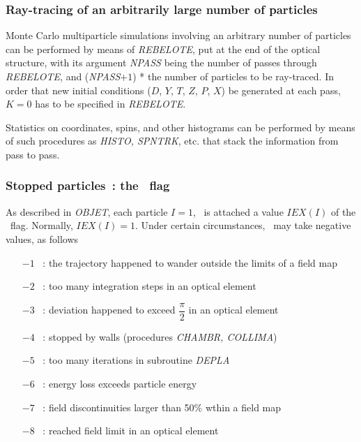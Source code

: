\subsubsection{Ray-tracing of an arbitrarily large number of particles} %
      \label{sec4.6.4}

Monte Carlo multiparticle  simulations involving an 
arbitrary number of particles
can be performed by means of \textsl{REBELOTE}, put at the end of the optical
structure, with its argument \textsl{NPASS} being the number of passes through 
\textsl{REBELOTE}, and (\textsl{NPASS}$+ 1$) * \IMAX{}  
the number of particles to 
be ray-traced. In order that new initial conditions  ($D$, $Y$, $T$, $Z$, 
$P$, $X$) 
 be generated at each pass, $ K=0 $ has to be specified in \textsl{REBELOTE}.
 
\noindent Statistics on coordinates, spins, and other histograms can be
performed by means of such procedures as \textsl{HISTO, SPNTRK}, 
etc. that stack the information from pass to pass. 


\subsubsection{Stopped particles~: the \IEX\ flag} 
\label{sec4.6.6}

As described in \textsl{OBJET}, each particle $I=1$, \IMAX\
 is attached a
value $IEX(I)$ of the \IEX\ flag. Normally, $IEX(I)=1$. Under certain 
circumstances, \IEX\ may take negative values, as follows

\begin{itemize}
\item[$-1$]~:  the trajectory happened to wander outside the limits of a field map 
\item[$-2$]~:  too many integration steps\index{integration step size} in an optical element
\item[$-3$]~:  deviation happened to exceed $\dfrac{\pi}{2} $ in an optical element 
\item[$-4$]~:  stopped by walls (procedures \textsl{CHAMBR, COLLIMA})  
\item[$-5$]~:  too many iterations in subroutine \textsl{DEPLA}  
\item[$-6$]~:  energy loss exceeds particle energy 
\item[$-7$]~:  field discontinuities larger than 50\% wthin a field map
\item[$-8$]~:  reached field limit in an optical element
\end{itemize}



